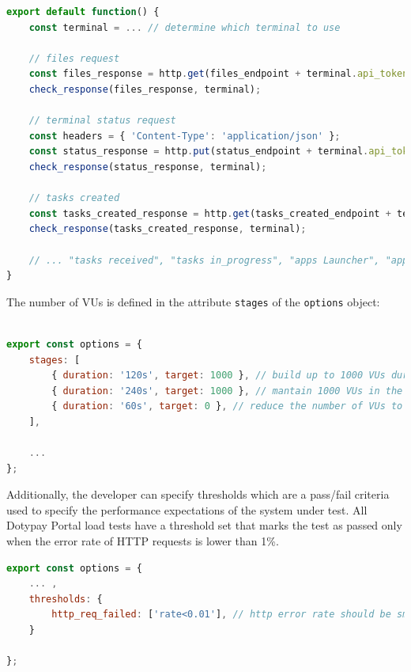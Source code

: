 \documentclass[12pt, a4paper]{article}
\begin{document}
\begin{lstlisting}[language=JavaScript, caption={Definition of first three HTTP requests calls in the terminal synchronization benchmark scenario},captionpos=b]
export default function() {
    const terminal = ... // determine which terminal to use 

    // files request
    const files_response = http.get(files_endpoint + terminal.api_token);
    check_response(files_response, terminal);

    // terminal status request
    const headers = { 'Content-Type': 'application/json' };
    const status_response = http.put(status_endpoint + terminal.api_token, JSON.stringify(status_endpoint_body), { headers: headers });
    check_response(status_response, terminal);

    // tasks created
    const tasks_created_response = http.get(tasks_created_endpoint + terminal.api_token);
    check_response(tasks_created_response, terminal);

    // ... "tasks received", "tasks in_progress", "apps Launcher", "apps Mandatory" and "apps optional" HTTP requests
}
\end{lstlisting}

The number of VUs is defined in the attribute \texttt{stages} of the \texttt{options} object:

\begin{lstlisting}[language=JavaScript, caption={Definition of the number of VUs during a load test},captionpos=b]

export const options = {
    stages: [
        { duration: '120s', target: 1000 }, // build up to 1000 VUs during the first two minutes
        { duration: '240s', target: 1000 }, // mantain 1000 VUs in the next four minutes
        { duration: '60s', target: 0 }, // reduce the number of VUs to zero in the next minute and finish the test
    ],

    ...
};

\end{lstlisting}

Additionally, the developer can specify thresholds which are a pass/fail criteria used to specify the performance expectations of the system under test.
All Dotypay Portal load tests have a threshold set that marks the test as passed only when the error rate of HTTP requests is lower than 1\%.

\begin{lstlisting}[language=JavaScript, caption={Threshold configuration for created load tests},captionpos=b]
export const options = {
    ... ,
    thresholds: {
        http_req_failed: ['rate<0.01'], // http error rate should be smaller than 1%
    }
    
};
\end{lstlisting}
\end{document}
